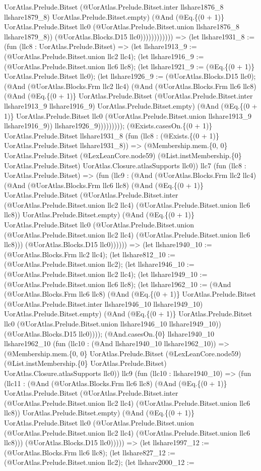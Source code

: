 \documentclass[11pt]{article}
\begin{document}
UorAtlas.Prelude.Bitset (@UorAtlas.Prelude.Bitset.inter llshare1876\_8 llshare1879\_8) UorAtlas.Prelude.Bitset.empty) (@And (@Eq.\{(0 + 1)\} UorAtlas.Prelude.Bitset llc0 (@UorAtlas.Prelude.Bitset.union llshare1876\_8 llshare1879\_8)) (@UorAtlas.Blocks.D15 llc0)))))))))))) => (let llshare1931\_8 := (fun (llc8 : UorAtlas.Prelude.Bitset) => (let llshare1913\_9 := (@UorAtlas.Prelude.Bitset.union llc2 llc4); (let llshare1916\_9 := (@UorAtlas.Prelude.Bitset.union llc6 llc8); (let llshare1921\_9 := (@Eq.\{(0 + 1)\} UorAtlas.Prelude.Bitset llc0); (let llshare1926\_9 := (@UorAtlas.Blocks.D15 llc0); (@And (@UorAtlas.Blocks.Frm llc2 llc4) (@And (@UorAtlas.Blocks.Frm llc6 llc8) (@And (@Eq.\{(0 + 1)\} UorAtlas.Prelude.Bitset (@UorAtlas.Prelude.Bitset.inter llshare1913\_9 llshare1916\_9) UorAtlas.Prelude.Bitset.empty) (@And (@Eq.\{(0 + 1)\} UorAtlas.Prelude.Bitset llc0 (@UorAtlas.Prelude.Bitset.union llshare1913\_9 llshare1916\_9)) llshare1926\_9))))))))); (@Exists.casesOn.\{(0 + 1)\} UorAtlas.Prelude.Bitset llshare1931\_8 (fun (llc8 : (@Exists.\{(0 + 1)\} UorAtlas.Prelude.Bitset llshare1931\_8)) => (@Membership.mem.\{0, 0\} UorAtlas.Prelude.Bitset (@LexLeanCore.node59) (@List.instMembership.\{0\} UorAtlas.Prelude.Bitset) UorAtlas.Closure.atlasSupports llc0)) llc7 (fun (llc8 : UorAtlas.Prelude.Bitset) => (fun (llc9 : (@And (@UorAtlas.Blocks.Frm llc2 llc4) (@And (@UorAtlas.Blocks.Frm llc6 llc8) (@And (@Eq.\{(0 + 1)\} UorAtlas.Prelude.Bitset (@UorAtlas.Prelude.Bitset.inter (@UorAtlas.Prelude.Bitset.union llc2 llc4) (@UorAtlas.Prelude.Bitset.union llc6 llc8)) UorAtlas.Prelude.Bitset.empty) (@And (@Eq.\{(0 + 1)\} UorAtlas.Prelude.Bitset llc0 (@UorAtlas.Prelude.Bitset.union (@UorAtlas.Prelude.Bitset.union llc2 llc4) (@UorAtlas.Prelude.Bitset.union llc6 llc8))) (@UorAtlas.Blocks.D15 llc0)))))) => (let llshare1940\_10 := (@UorAtlas.Blocks.Frm llc2 llc4); (let llshare812\_10 := (@UorAtlas.Prelude.Bitset.union llc2); (let llshare1946\_10 := (@UorAtlas.Prelude.Bitset.union llc2 llc4); (let llshare1949\_10 := (@UorAtlas.Prelude.Bitset.union llc6 llc8); (let llshare1962\_10 := (@And (@UorAtlas.Blocks.Frm llc6 llc8) (@And (@Eq.\{(0 + 1)\} UorAtlas.Prelude.Bitset (@UorAtlas.Prelude.Bitset.inter llshare1946\_10 llshare1949\_10) UorAtlas.Prelude.Bitset.empty) (@And (@Eq.\{(0 + 1)\} UorAtlas.Prelude.Bitset llc0 (@UorAtlas.Prelude.Bitset.union llshare1946\_10 llshare1949\_10)) (@UorAtlas.Blocks.D15 llc0)))); (@And.casesOn.\{0\} llshare1940\_10 llshare1962\_10 (fun (llc10 : (@And llshare1940\_10 llshare1962\_10)) => (@Membership.mem.\{0, 0\} UorAtlas.Prelude.Bitset (@LexLeanCore.node59) (@List.instMembership.\{0\} UorAtlas.Prelude.Bitset) UorAtlas.Closure.atlasSupports llc0)) llc9 (fun (llc10 : llshare1940\_10) => (fun (llc11 : (@And (@UorAtlas.Blocks.Frm llc6 llc8) (@And (@Eq.\{(0 + 1)\} UorAtlas.Prelude.Bitset (@UorAtlas.Prelude.Bitset.inter (@UorAtlas.Prelude.Bitset.union llc2 llc4) (@UorAtlas.Prelude.Bitset.union llc6 llc8)) UorAtlas.Prelude.Bitset.empty) (@And (@Eq.\{(0 + 1)\} UorAtlas.Prelude.Bitset llc0 (@UorAtlas.Prelude.Bitset.union (@UorAtlas.Prelude.Bitset.union llc2 llc4) (@UorAtlas.Prelude.Bitset.union llc6 llc8))) (@UorAtlas.Blocks.D15 llc0))))) => (let llshare1997\_12 := (@UorAtlas.Blocks.Frm llc6 llc8); (let llshare827\_12 := (@UorAtlas.Prelude.Bitset.union llc2); (let llshare2000\_12 := 
\end{document}
